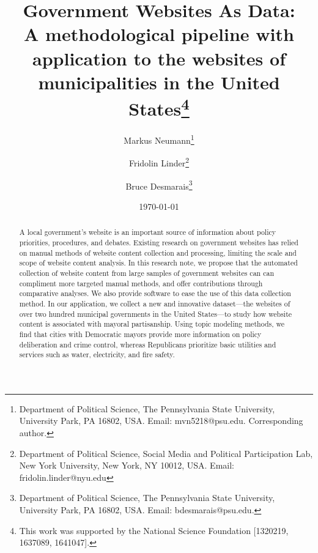 \documentclass[11pt]{article}
\title{\vspace{-2cm} Government Websites As Data: \\ A methodological pipeline with application to the websites of municipalities in the United States\footnote{This work was supported by the National Science Foundation [1320219, 1637089, 1641047].}}
\author{ Markus Neumann\footnote{Department of Political Science, The Pennsylvania State University, University Park, PA 16802, USA. Email: mvn5218@psu.edu. Corresponding author.} \and Fridolin Linder\footnote{Department of Political Science, Social Media and Political Participation Lab, New York University, New York, NY 10012, USA. Email: fridolin.linder@nyu.edu} \and Bruce Desmarais\footnote{Department of Political Science, The Pennsylvania State University, University Park, PA 16802, USA. Email: bdesmarais@psu.edu. }} \date{\today}
\begin{document}
\maketitle 




\begin{abstract}

A local government's website is an important source of information about policy priorities,  procedures, and debates. Existing research on government websites has relied on manual methods of website content collection and processing, limiting the scale and scope of website content analysis. In this research note, we propose that the automated collection of website content from large samples of government websites can can compliment more targeted manual methods, and offer contributions through comparative analyses.  We also provide software to ease the use of this data collection method. In our application, we collect a new and innovative dataset---the websites of over two hundred municipal governments in the United States---to study how website content is associated with mayoral partisanship. Using topic modeling methods, we find that cities with Democratic mayors provide more information on policy deliberation and crime control, whereas Republicans prioritize basic utilities and services such as water, electricity, and fire safety. 

\end{abstract}
\thispagestyle{empty}
\doublespacing
\end{document}
